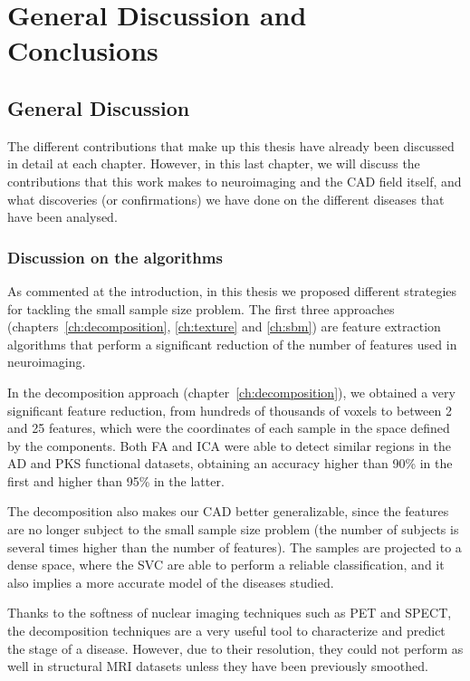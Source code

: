 \chapter{General Discussion and Conclusions}\label{ch:discusion}
\section{General Discussion}
The different contributions that make up this thesis have already been discussed in detail at each chapter. However, in this last chapter, we will discuss the contributions that this work makes to neuroimaging and the \ac{CAD} field itself, and what discoveries (or confirmations) we have done on the different diseases that have been analysed. 

\subsection{Discussion on the algorithms}
As commented at the introduction, in this thesis we proposed different strategies for tackling the small sample size problem. The first three approaches (chapters~\ref{ch:decomposition}, \ref{ch:texture} and \ref{ch:sbm}) are feature extraction algorithms that perform a significant reduction of the number of features used in neuroimaging. 

In the decomposition approach (chapter~\ref{ch:decomposition}), we obtained a very significant feature reduction, from hundreds of thousands of voxels to between 2 and 25 features, which were the coordinates of each sample in the space defined by the components. Both \ac{FA} and \ac{ICA} were able to detect similar regions in the \ac{AD} and \ac{PKS} functional datasets, obtaining an accuracy higher than 90\% in the first and higher than 95\% in the latter. 

The decomposition also makes our \ac{CAD} better generalizable, since the features are no longer subject to the small sample size problem (the number of subjects is several times higher than the number of features). The samples are projected to a dense space, where the \ac{SVC} are able to perform a reliable classification, and it also implies a more accurate model of the diseases studied. 

Thanks to the softness of nuclear imaging techniques such as \ac{PET} and \ac{SPECT}, the decomposition techniques are a very useful tool to characterize and predict the stage of a disease. However, due to their resolution, they could not perform as well in structural \ac{MRI} datasets unless they have been previously smoothed. 

